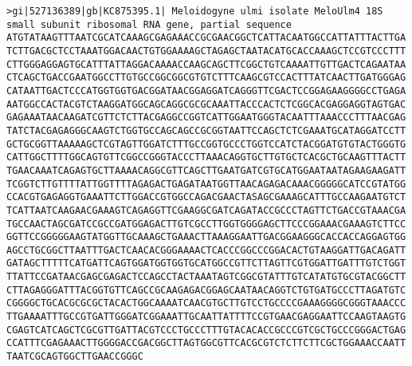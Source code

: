\documentclass[11pt]{article}
\begin{document}
\begin{Verbatim}[commandchars=\\\{\}]
>gi|527136389|gb|KC875395.1| Meloidogyne ulmi isolate MeloUlm4 18S small subunit ribosomal RNA gene, partial sequence
ATGTATAAGTTTAATCGCATCAAAGCGAGAAACCGCGAACGGCTCATTACAATGGCCATTATTTACTTGA
TCTTGACGCTCCTAAATGGACAACTGTGGAAAAGCTAGAGCTAATACATGCACCAAAGCTCCGTCCCTTT
CTTGGGAGGAGTGCATTTATTAGGACAAAACCAAGCAGCTTCGGCTGTCAAAATTGTTGACTCAGAATAA
CTCAGCTGACCGAATGGCCTTGTGCCGGCGGCGTGTCTTTCAAGCGTCCACTTTATCAACTTGATGGGAG
CATAATTGACTCCCATGGTGGTGACGGATAACGGAGGATCAGGGTTCGACTCCGGAGAAGGGGCCTGAGA
AATGGCCACTACGTCTAAGGATGGCAGCAGGCGCGCAAATTACCCACTCTCGGCACGAGGAGGTAGTGAC
GAGAAATAACAAGATCGTTCTCTTACGAGGCCGGTCATTGGAATGGGTACAATTTAAACCCTTTAACGAG
TATCTACGAGAGGGCAAGTCTGGTGCCAGCAGCCGCGGTAATTCCAGCTCTCGAAATGCATAGGATCCTT
GCTGCGGTTAAAAAGCTCGTAGTTGGATCTTTGCCGGTGCCCTGGTCCATCTACGGATGTGTACTGGGTG
CATTGGCTTTTGGCAGTGTTCGGCCGGGTACCCTTAAACAGGTGCTTGTGCTCACGCTGCAAGTTTACTT
TGAACAAATCAGAGTGCTTAAAACAGGCGTTCAGCTTGAATGATCGTGCATGGAATAATAGAAGAAGATT
TCGGTCTTGTTTTATTGGTTTTAGAGACTGAGATAATGGTTAACAGAGACAAACGGGGGCATCCGTATGG
CCACGTGAGAGGTGAAATTCTTGGACCGTGGCCAGACGAACTASAGCGAAAGCATTTGCCAAGAATGTCT
TCATTAATCAAGAACGAAAGTCAGAGGTTCGAAGGCGATCAGATACCGCCCTAGTTCTGACCGTAAACGA
TGCCAACTAGCGATCCGCCGATGGAGACTTGTCGCCTTGGTGGGGAGCTTCCCGGAAACGAAAGTCTTCC
GGTTCCGGGGGAAGTATGGTTGCAAAGCTGAAACTTAAAGGAATTGACGGAAGGGCACCACCAGGAGTGG
AGCCTGCGGCTTAATTTGACTCAACACGGGAAAACTCACCCGGCCCGGACACTGTAAGGATTGACAGATT
GATAGCTTTTTCATGATTCAGTGGATGGTGGTGCATGGCCGTTCTTAGTTCGTGGATTGATTTGTCTGGT
TTATTCCGATAACGAGCGAGACTCCAGCCTACTAAATAGTCGGCGTATTTGTCATATGTGCGTACGGCTT
CTTAGAGGGATTTACGGTGTTCAGCCGCAAGAGACGGAGCAATAACAGGTCTGTGATGCCCTTAGATGTC
CGGGGCTGCACGCGCGCTACACTGGCAAAATCAACGTGCTTGTCCTGCCCCGAAAGGGGCGGGTAAACCC
TTGAAAATTTGCCGTGATTGGGATCGGAAATTGCAATTATTTTCCGTGAACGAGGAATTCCAAGTAAGTG
CGAGTCATCAGCTCGCGTTGATTACGTCCCTGCCCTTTGTACACACCGCCCGTCGCTGCCCGGGACTGAG
CCATTTCGAGAAACTTGGGGACCGACGGCTTAGTGGCGTTCACGCGTCTCTTCTTCGCTGGAAACCAATT
TAATCGCAGTGGCTTGAACCGGGC


\end{Verbatim}
\end{document}
